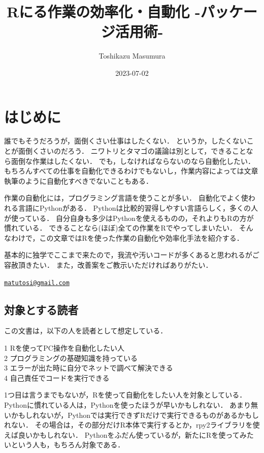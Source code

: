 \documentclass[
]{article}
\title{Rにる作業の効率化・自動化 -パッケージ活用術-}
\author{Toshikazu Masumura}
\date{2023-07-02}
\begin{document}
\maketitle

{
\setcounter{tocdepth}{2}
\tableofcontents
}
\hypertarget{ux306fux3058ux3081ux306b}{%
\section*{はじめに}\label{ux306fux3058ux3081ux306b}}

誰でもそうだろうが，面倒くさい仕事はしたくない．
というか，したくないことが面倒くさいのだろう．
ニワトリとタマゴの議論は別として，できることなら面倒な作業はしたくない．
でも，しなければならないのなら自動化したい．
もちろんすべての仕事を自動化できるわけでもないし，作業内容によっては文章執筆のように自動化すべきでないこともある．

作業の自動化には，プログラミング言語を使うことが多い．
自動化でよく使われる言語にPythonがある．
Pythonは比較的習得しやすい言語らしく，多くの人が使っている．
自分自身も多少はPythonを使えるものの，それよりもRの方が慣れている．
できることなら(ほぼ)全ての作業をRでやってしまいたい．
そんなわけで，この文章ではRを使った作業の自動化や効率化手法を紹介する．

基本的に独学でここまで来たので，我流や汚いコードが多くあると思われるがご容赦頂きたい．
また，改善案をご教示いただければありがたい．

\href{mailto:matutosi@gmail.com}{\nolinkurl{matutosi@gmail.com}}

\hypertarget{ux5bfeux8c61ux3068ux3059ux308bux8aadux8005}{%
\subsection{対象とする読者}\label{ux5bfeux8c61ux3068ux3059ux308bux8aadux8005}}

この文書は，以下の人を読者として想定している．

1 Rを使ってPC操作を自動化したい人\\
2 プログラミングの基礎知識を持っている\\
3 エラーが出た時に自分でネットで調べて解決できる\\
4 自己責任でコードを実行できる

1つ目は言うまでもないが，Rを使って自動化をしたい人を対象としている．
Pythonに慣れている人は，Pythonを使ったほうが早いかもしれない．
あまり無いかもしれないが，Pythonでは実行できずRだけで実行できるものがあるかもしれない．
その場合は，その部分だけR本体で実行するとか，rpy2ライブラリを使えば良いかもしれない．
Pythonをふだん使っているが，新たにRを使ってみたいという人も，もちろん対象である．
\end{document}
